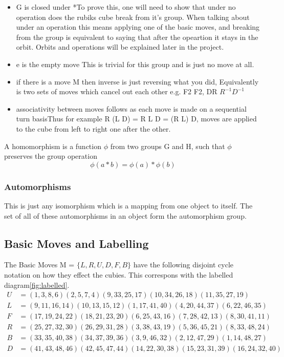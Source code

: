 \documentclass{article}
\begin{document}
\begin{itemize}
\item G is closed under *\newline To prove this, one will need to show that under no operation does the rubiks cube break from it's group. When talking about under an operation this means applying one of the basic moves, and breaking from the group is equivalent to saying that after the opeartion it stays in the orbit. Orbits and operations will be explained later in the project. 

\item e is the empty move \newline This is trivial for this group and is just no move at all.

\item if there is a move M then inverse is just reversing what you did\newline , Equivalently is two sets of moves which cancel out each other e.g. F2 F2, DR $R^{-1}D^{-1}$
\item associativity between moves follows as each move is made on a sequential turn basis\newline Thus for example R (L D) = R L D = (R L) D, moves are applied to the cube from left to right one after the other.
\end{itemize}
A homomorphism is a function $\phi $ from two groups G and H,  such that $\phi$ preserves the group operation 
\begin{equation}
	\phi(a*b)= \phi(a) * \phi(b)
\end{equation}
\subsubsection{Automorphisms}
This is just any isomorphism which is a mapping from one object to itself. The set of all of these automorphisms in an object form the automorphism group.

\subsection{Basic Moves and Labelling}
The Basic Moves M = $\{L,R,U,D,F,B\}$ have the following disjoint cycle notation on how they effect the cubies. This correspons with the labelled diagram\ref{fig:labelled}.
\begin{align*}
U&=( 1, 3, 8, 6)( 2, 5, 7, 4)( 9,33,25,17)(10,34,26,18)(11,35,27,19)\\
L&=( 9,11,16,14)(10,13,15,12)( 1,17,41,40)( 4,20,44,37)( 6,22,46,35)\\
F&=(17,19,24,22)(18,21,23,20)( 6,25,43,16)( 7,28,42,13)( 8,30,41,11)\\
R&=(25,27,32,30)(26,29,31,28)( 3,38,43,19)( 5,36,45,21)( 8,33,48,24)\\
B&=(33,35,40,38)(34,37,39,36)( 3, 9,46,32)( 2,12,47,29)( 1,14,48,27)\\
D&= (41,43,48,46)(42,45,47,44)(14,22,30,38)(15,23,31,39)(16,24,32,40)
\end{align*}
\end{document}

